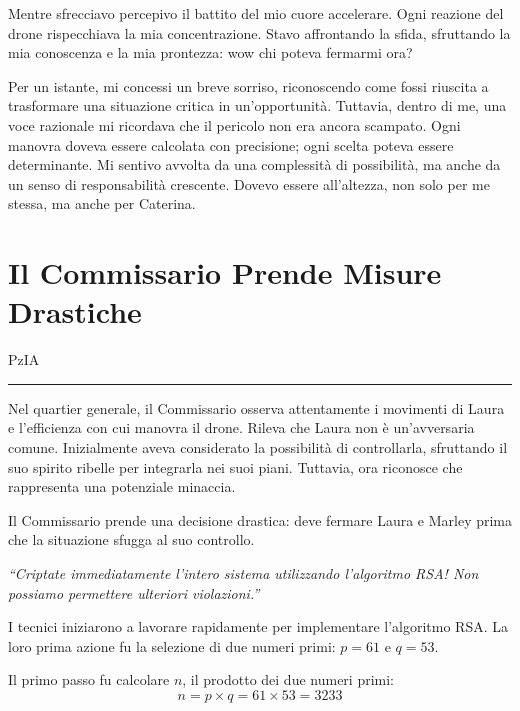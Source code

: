 Mentre sfrecciavo percepivo il battito del mio cuore accelerare. Ogni reazione del drone rispecchiava la mia concentrazione. Stavo affrontando la sfida, sfruttando la mia conoscenza e la mia prontezza: wow chi poteva fermarmi ora?

Per un istante, mi concessi un breve sorriso, riconoscendo come fossi riuscita a trasformare una situazione critica in un'opportunità. Tuttavia, dentro di me, una voce razionale mi ricordava che il pericolo non era ancora scampato. Ogni manovra doveva essere calcolata con precisione; ogni scelta poteva essere determinante. Mi sentivo avvolta da una complessità di possibilità, ma anche da un senso di responsabilità crescente. Dovevo essere all'altezza, non solo per me stessa, ma anche per Caterina.

\section{Il Commissario Prende Misure Drastiche}

\vspace{1em}
\begin{center}PzIA\end{center}
\hrule
\vspace{1em}


Nel quartier generale, il Commissario osserva attentamente i movimenti di Laura e l'efficienza con cui manovra il drone. Rileva che Laura non è un'avversaria comune. Inizialmente aveva considerato la possibilità di controllarla, sfruttando il suo spirito ribelle per integrarla nei suoi piani. Tuttavia, ora riconosce che rappresenta una potenziale minaccia.

Il Commissario prende una decisione drastica: deve fermare Laura e Marley prima che la situazione sfugga al suo controllo.

\begin{tcolorbox}[colback=white!95!blue!5, colframe=blue!75!black, title=\textbf{Ordine del Commissario}, fonttitle=\bfseries]
\emph{\enquote{Criptate immediatamente l’intero sistema utilizzando l'algoritmo RSA! Non possiamo permettere ulteriori violazioni.}}
\end{tcolorbox}

I tecnici iniziarono a lavorare rapidamente per implementare l’algoritmo RSA. 
La loro prima azione fu la selezione di due numeri primi: \( p = 61 \) e \( q = 53 \).

Il primo passo fu calcolare \( n \), il prodotto dei due numeri primi:
\[
n = p \times q = 61 \times 53 = 3233\]


